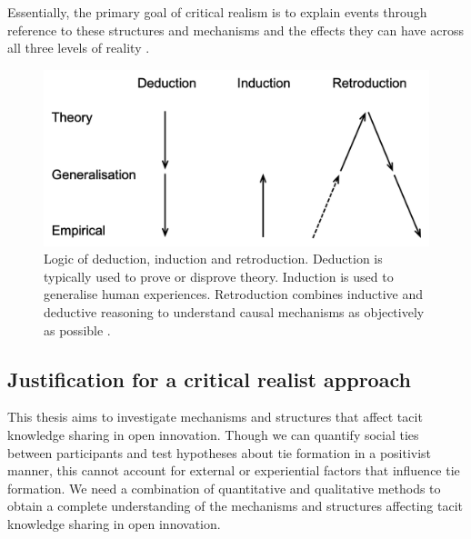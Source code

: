 Essentially, the primary goal of critical realism is to explain events through reference to these structures and mechanisms and the effects they can have across all three levels of reality \citep{wynn2012principles,fletcher2017applying}. \medskip

\begin{figure}[h!]
\centering
\includegraphics[width=0.7\linewidth]{Images/retroduction.png}
\caption[Logic of deduction, induction and retroduction]{Logic of deduction, induction and retroduction. Deduction is typically used to prove or disprove theory. Induction is used to generalise human experiences. Retroduction combines inductive and deductive reasoning to understand causal mechanisms as objectively as possible \citep{saether1998retroduction}.}
\label{fig:retroduction}
\end{figure}

\subsection{Justification for a critical realist approach}

This thesis aims to investigate mechanisms and structures that affect tacit knowledge sharing in open innovation. Though we can quantify social ties between participants and test hypotheses about tie formation in a positivist manner, this cannot account for external or experiential factors that influence tie formation. We need a combination of quantitative and qualitative methods to obtain a complete understanding of the mechanisms and structures affecting tacit knowledge sharing in open innovation. \medskip

